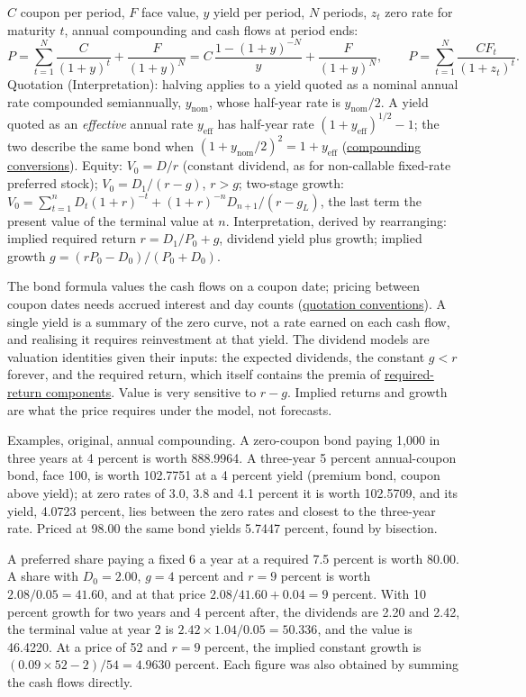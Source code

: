 \begin{qfmethod}
 $C$ coupon per period, $F$ face value, $y$ yield per period, $N$ periods, $z_t$ zero rate for maturity $t$, annual compounding and cash flows at period ends:
\[ P=\sum_{t=1}^{N}\frac{C}{(1+y)^t}+\frac{F}{(1+y)^N}=C\,\frac{1-(1+y)^{-N}}{y}+\frac{F}{(1+y)^N},\qquad P=\sum_{t=1}^{N}\frac{CF_t}{(1+z_t)^t}. \]
Quotation (Interpretation): halving applies to a yield quoted as a nominal annual rate compounded semiannually, $y_{\mathrm{nom}}$, whose half-year rate is $y_{\mathrm{nom}}/2$. A yield quoted as an \emph{effective} annual rate $y_{\mathrm{eff}}$ has half-year rate $(1+y_{\mathrm{eff}})^{1/2}-1$; the two describe the same bond when $(1+y_{\mathrm{nom}}/2)^2=1+y_{\mathrm{eff}}$ (\hyperref[def:interest-rate-measures]{compounding conversions}). Equity: $V_0=D/r$ (constant dividend, as for non-callable fixed-rate preferred stock); $V_0=D_1/(r-g)$, $r>g$; two-stage growth: $V_0=\sum_{t=1}^{n}D_t(1+r)^{-t}+(1+r)^{-n}D_{n+1}/(r-g_L)$, the last term the present value of the terminal value at $n$. Interpretation, derived by rearranging: implied required return $r=D_1/P_0+g$, dividend yield plus growth; implied growth $g=(rP_0-D_0)/(P_0+D_0)$.

 The bond formula values the cash flows on a coupon date; pricing between coupon dates needs accrued interest and day counts (\hyperref[conv:us-rate-quotation]{quotation conventions}). A single yield is a summary of the zero curve, not a rate earned on each cash flow, and realising it requires reinvestment at that yield. The dividend models are valuation identities given their inputs: the expected dividends, the constant $g<r$ forever, and the required return, which itself contains the premia of \hyperref[def:required-return-components]{required-return components}. Value is very sensitive to $r-g$. Implied returns and growth are what the price requires under the model, not forecasts.

 Examples, original, annual compounding. A zero-coupon bond paying 1{,}000 in three years at 4 percent is worth 888.9964. A three-year 5 percent annual-coupon bond, face 100, is worth 102.7751 at a 4 percent yield (premium bond, coupon above yield); at zero rates of 3.0, 3.8 and 4.1 percent it is worth 102.5709, and its yield, 4.0723 percent, lies between the zero rates and closest to the three-year rate. Priced at 98.00 the same bond yields 5.7447 percent, found by bisection.

A preferred share paying a fixed 6 a year at a required 7.5 percent is worth 80.00. A share with $D_0=2.00$, $g=4$ percent and $r=9$ percent is worth $2.08/0.05=41.60$, and at that price $2.08/41.60+0.04=9$ percent. With 10 percent growth for two years and 4 percent after, the dividends are 2.20 and 2.42, the terminal value at year 2 is $2.42\times1.04/0.05=50.336$, and the value is 46.4220. At a price of 52 and $r=9$ percent, the implied constant growth is $(0.09\times52-2)/54=4.9630$ percent. Each figure was also obtained by summing the cash flows directly.


\end{qfmethod}
